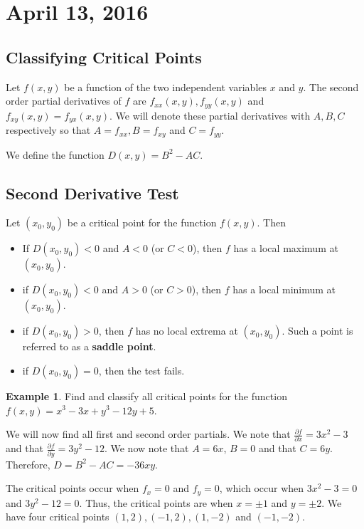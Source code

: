 \documentclass[11pt]{article}
\theoremstyle{plain} %
\theoremstyle{definition}
\theoremstyle{example}
\newtheorem*{example}{Example}
\theoremstyle{remark}
\begin{document}
\section{April 13, 2016}
\subsection{Classifying Critical Points}
Let $f(x,y)$ be a function of the two independent variables $x$ and $y$. The second order partial derivatives of $f$ are $f_{xx}(x,y), f_{yy}(x,y)$ and $ f_{xy}(x,y)=f_{yx}(x,y)$. 
We will denote these partial derivatives with $A,B,C$ respectively so that $A=f_{xx}, B=f_{xy}$ and $C=f_{yy}$.

We define the function $D(x,y) = B^2-AC$. 

\subsection{Second Derivative Test}

Let $(x_0, y_0)$ be a critical point for the function $f(x,y)$. Then

\begin{itemize}
	\item If $D(x_0, y_0)<0$ and $A < 0$ (or $C<0$), then $f$ has a local maximum at $(x_0, y_0)$. 
	\item if $D(x_0,y_0)<0$ and $A>0$ (or $C>0$), then $f$ has a local minimum at $(x_0, y_0)$. 
	\item if $D(x_0, y_0) > 0$, then $f$ has no local extrema at $(x_0, y_0)$. Such a point is referred to as a \textbf{saddle point}.
	\item if $D(x_0, y_0)=0$, then the test fails. 
\end{itemize}
	
	\begin{example}
	Find and classify all critical points for the function $f(x,y) = x^3-3x+y^3-12y+5$. 
	\end{example}

We will now find all first and second order partials. 
We note that $\frac{\partial f}{\partial x} = 3x^2-3$ and that $\frac{\partial f}{\partial y} =3y^2 -12$. We now note that $A = 6x$, $B=0$ and that $C=6y$. Therefore, $D = B^2-AC= -36xy$. 

The critical points occur when $f_x=0$ and $f_y=0$, which occur when $3x^2-3=0$ and $3y^2-12=0$. Thus, the critical points are when $x= \pm 1$ and $y = \pm 2$. We have four critical points $(1, 2), (-1, 2), (1, -2)$ and  $(-1, -2)$. 
\end{document}
